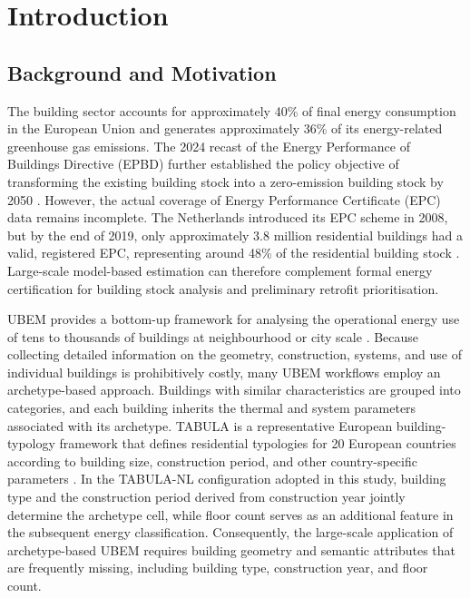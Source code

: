 \chapter{Introduction}
\label{ch:introduction}

\section{Background and Motivation}
\label{sec:background_motivation}

The building sector accounts for approximately 40\% of final energy consumption in the European Union and generates approximately 36\% of its energy-related greenhouse gas emissions.
The 2024 recast of the Energy Performance of Buildings Directive (EPBD) further established the policy objective of transforming the existing building stock into a zero-emission building stock by 2050 \parencite{epbd2024}.
However, the actual coverage of Energy Performance Certificate (EPC) data remains incomplete.
The Netherlands introduced its EPC scheme in 2008, but by the end of 2019, only approximately 3.8 million residential buildings had a valid, registered EPC, representing around 48\% of the residential building stock \parencite{caepbd2020}.
Large-scale model-based estimation can therefore complement formal energy certification for building stock analysis and preliminary retrofit prioritisation.

\Acf{UBEM} provides a bottom-up framework for analysing the operational energy use of tens to thousands of buildings at neighbourhood or city scale \parencite{reinhart2016}.
Because collecting detailed information on the geometry, construction, systems, and use of individual buildings is prohibitively costly, many \ac{UBEM} workflows employ an archetype-based approach.
Buildings with similar characteristics are grouped into categories, and each building inherits the thermal and system parameters associated with its archetype.
TABULA is a representative European building-typology framework that defines residential typologies for 20 European countries according to building size, construction period, and other country-specific parameters \parencite{loga2016}.
In the TABULA-NL configuration adopted in this study, building type and the construction period derived from construction year jointly determine the archetype cell, while floor count serves as an additional feature in the subsequent energy classification.
Consequently, the large-scale application of archetype-based \ac{UBEM} requires building geometry and semantic attributes that are frequently missing, including building type, construction year, and floor count.


